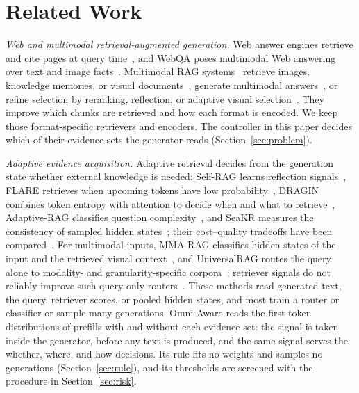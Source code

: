 \documentclass[sigconf,anonymous,review]{acmart}
\newcommand{\method}{Omni-Aware}
\begin{document}
\section{Related Work}
\label{sec:related}

\textit{Web and multimodal retrieval-augmented generation.}
Web answer engines retrieve and cite pages at query time~\cite{nakano2021webgpt,liu2023webglm}, and WebQA poses multimodal Web answering over text and image facts~\cite{chang2022webqa}.
Multimodal RAG systems~\cite{abootorabi2025survey} retrieve images, knowledge memories, or visual documents~\cite{adjali2024multilevel,chen2022murag,hu2023reveal,wang2025vidorag,yu2025visrag}, generate multimodal answers~\cite{ma2025m2rag,wu2025visualrag}, or refine selection by reranking, reflection, or adaptive visual selection~\cite{chen2025ragvl,zhai2025samrag,zhang2024mr2ag}.
They improve which chunks are retrieved and how each format is encoded.
We keep those format-specific retrievers and encoders.
The controller in this paper decides which of their evidence sets the generator reads (Section~\ref{sec:problem}).

\textit{Adaptive evidence acquisition.}
Adaptive retrieval decides from the generation state whether external knowledge is needed: Self-RAG learns reflection signals~\cite{asai2024selfrag}, FLARE retrieves when upcoming tokens have low probability~\cite{jiang2023flare}, DRAGIN combines token entropy with attention to decide when and what to retrieve~\cite{su2024dragin}, Adaptive-RAG classifies question complexity~\cite{jeong2024adaptiverag}, and SeaKR measures the consistency of sampled hidden states~\cite{yao2025seakr}; their cost--quality tradeoffs have been compared~\cite{moskvoretskii2025adaptive}.
For multimodal inputs, MMA-RAG classifies hidden states of the input and the retrieved visual context~\cite{du2026mmarag}, and UniversalRAG routes the query alone to modality- and granularity-specific corpora~\cite{yeo2026universalrag}; retriever signals do not reliably improve such query-only routers~\cite{li2026beyond}.
These methods read generated text, the query, retriever scores, or pooled hidden states, and most train a router or classifier or sample many generations.
\method{} reads the first-token distributions of prefills with and without each evidence set: the signal is taken inside the generator, before any text is produced, and the same signal serves the whether, where, and how decisions. Its rule fits no weights and samples no generations (Section~\ref{sec:rule}), and its thresholds are screened with the procedure in Section~\ref{sec:risk}.
\end{document}
